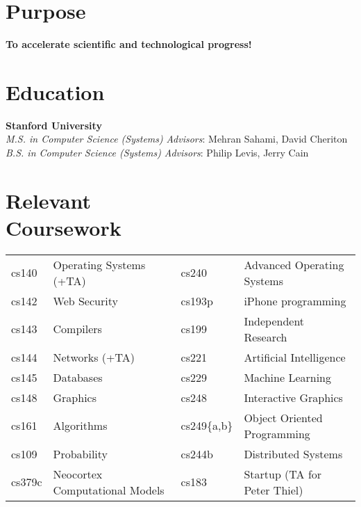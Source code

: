 \documentclass[margin,line]{resume}
\begin{document}
\begin{resume}


    \section{\mysidestyle Purpose}
    \textbf{To accelerate scientific and technological progress!}


    \section{\mysidestyle Education}

    \textbf{Stanford University} \vspace{2mm}\\\vspace{1mm}%
    \textsl{M.S. in Computer Science (Systems)}  \hfill \emph{Advisors}: Mehran Sahami, David Cheriton\\
    \textsl{B.S. in Computer Science (Systems)}  \hfill \emph{Advisors}: Philip Levis, Jerry Cain

    \section{\mysidestyle Relevant \\ Coursework}
    \begin{tabular}{llll}
cs140  & Operating Systems (+TA) \hspace{0.15\textwidth}
                             &  cs240  & Advanced Operating Systems \\
cs142  & Web Security        &  cs193p & iPhone programming     \\
cs143  & Compilers           &  cs199  & Independent Research    \\
cs144  & Networks (+TA)      &  cs221  & Artificial Intelligence \\
cs145  & Databases           &  cs229  & Machine Learning        \\
cs148  & Graphics            &  cs248  & Interactive Graphics  \\
cs161  & Algorithms          &  cs249\{a,b\} & Object Oriented Programming \\
cs109  & Probability         &  cs244b & Distributed Systems    \\
cs379c & Neocortex Computational Models
                             &  cs183 & Startup (TA for Peter Thiel) \\
    \end{tabular}



\end{resume}
\end{document}
